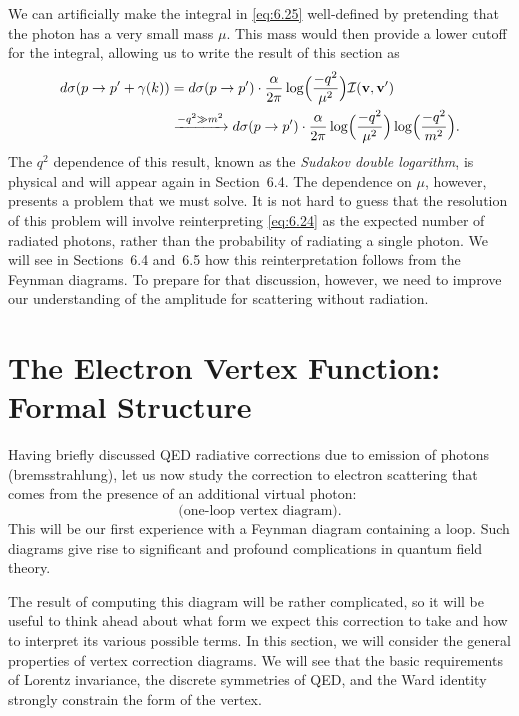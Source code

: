 We can artificially make the integral in \eqref{eq:6.25} well-defined by
pretending that the photon has a very small mass $\mu$.  This mass would then
provide a lower cutoff for the integral, allowing us to write the result of
this section as
\begin{equation}
  \begin{aligned}
    d\sigma(p\to p'+\gamma(k)) &= d\sigma(p\to p')\cdot
      \frac{\alpha}{2\pi}\log\Bigl( \frac{-q^2}{\mu^2} \Bigr)
      \mathcal{I}(\mathbf{v},\mathbf{v}')\\
    &\xrightarrow{-q^2\gg m^2}
    d\sigma(p\to p')\cdot \frac{\alpha}{2\pi}
      \log\Bigl( \frac{-q^2}{\mu^2} \Bigr)\log\Bigl( \frac{-q^2}{m^2} \Bigr).
  \end{aligned}
  \label{eq:6.26}
\end{equation}
The $q^2$ dependence of this result, known as the \emph{Sudakov double
logarithm}, is physical and will appear again in Section~6.4.  The dependence
on $\mu$, however, presents a problem that we must solve.  It is not hard to
guess that the resolution of this problem will involve reinterpreting
\eqref{eq:6.24} as the expected number of radiated photons, rather than the
probability of radiating a single photon.  We will see in Sections~6.4 and~6.5
how this reinterpretation follows from the Feynman diagrams.  To prepare for
that discussion, however, we need to improve our understanding of the
amplitude for scattering without radiation.

\section{The Electron Vertex Function: Formal Structure}

Having briefly discussed QED radiative corrections due to emission of photons
(bremsstrahlung), let us now study the correction to electron scattering that
comes from the presence of an additional virtual photon:
\begin{equation}
  \text{(one-loop vertex diagram)} .
  \label{eq:6.27}
\end{equation}
This will be our first experience with a Feynman diagram containing a loop.
Such diagrams give rise to significant and profound complications in quantum
field theory.

The result of computing this diagram will be rather complicated, so it will be
useful to think ahead about what form we expect this correction to take and
how to interpret its various possible terms.  In this section, we will
consider the general properties of vertex correction diagrams.  We will see
that the basic requirements of Lorentz invariance, the discrete symmetries of
QED, and the Ward identity strongly constrain the form of the vertex.

